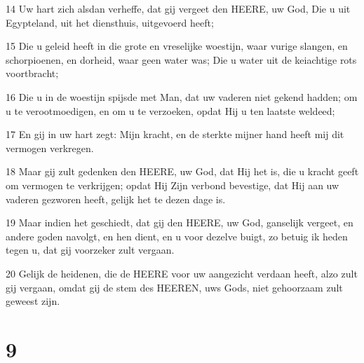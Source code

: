 \par 14 Uw hart zich alsdan verheffe, dat gij vergeet den HEERE, uw God, Die u uit Egypteland, uit het diensthuis, uitgevoerd heeft;
\par 15 Die u geleid heeft in die grote en vreselijke woestijn, waar vurige slangen, en schorpioenen, en dorheid, waar geen water was; Die u water uit de keiachtige rots voortbracht;
\par 16 Die u in de woestijn spijsde met Man, dat uw vaderen niet gekend hadden; om u te verootmoedigen, en om u te verzoeken, opdat Hij u ten laatste weldeed;
\par 17 En gij in uw hart zegt: Mijn kracht, en de sterkte mijner hand heeft mij dit vermogen verkregen.
\par 18 Maar gij zult gedenken den HEERE, uw God, dat Hij het is, die u kracht geeft om vermogen te verkrijgen; opdat Hij Zijn verbond bevestige, dat Hij aan uw vaderen gezworen heeft, gelijk het te dezen dage is.
\par 19 Maar indien het geschiedt, dat gij den HEERE, uw God, ganselijk vergeet, en andere goden navolgt, en hen dient, en u voor dezelve buigt, zo betuig ik heden tegen u, dat gij voorzeker zult vergaan.
\par 20 Gelijk de heidenen, die de HEERE voor uw aangezicht verdaan heeft, alzo zult gij vergaan, omdat gij de stem des HEEREN, uws Gods, niet gehoorzaam zult geweest zijn.

\chapter{9}

